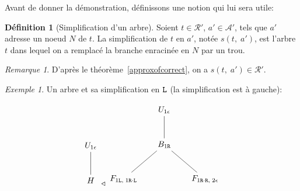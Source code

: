 \documentclass[11pt,a4paper]{article}
\theoremstyle{plain}
\theoremstyle{definition}
\newtheorem{definition}{Définition}
\theoremstyle{remark}
\newtheorem{remark}{Remarque}
\newtheorem{example}{Exemple}
\newcommand*{\Left}{\textnormal{\texttt{L}}}
\newcommand*{\Right}{\textnormal{\texttt{R}}}
\newcommand*{\treeaddresses}{\ensuremath{\mathcal{A'}}}
\newcommand*{\representationspartial}{\ensuremath{\mathcal{R'}}}
\newcommand*{\relapprox}{\ensuremath{\triangleleft}}
\newcommand*{\unknown}{H}
\newcommand*{\treesimplify}{\ensuremath{s}}
\begin{document}
Avant de donner la démonstration, définissons une notion qui lui sera utile:

\begin{definition}[Simplification d'un arbre]
    Soient $t \in \representationspartial$, $a' \in \treeaddresses$, tels que $a'$ adresse un noeud $N$ de $t$. La simplification de $t$ en $a'$, notée $\treesimplify(t, \; a')$, est l'arbre $t$ dans lequel on a remplacé la branche enracinée en $N$ par un trou. 
\end{definition}

\begin{remark}
    D'après le théorème~\ref{approxofcorrect}, on a $\treesimplify(t, \; a') \in \representationspartial$.
\end{remark}

\begin{example}
    Un arbre et sa simplification en $\Left$ (la simplification est à gauche):

        \begin{equation*}
        \begin{tikzpicture}%
            [level distance=1.5cm,
            level 2/.style={sibling distance=3.5cm}]
            \node {$U_{1 \epsilon}$}
            child {node {$\unknown$}
            };
        \end{tikzpicture}
        \relapprox
        \begin{tikzpicture}%
            [level distance=1.5cm,
            level 2/.style={sibling distance=3.5cm}]
            \node {$U_{1 \epsilon}$}
            child {node {$B_{1 \Right}$}
                child {node {$F_{1 \Left, \; 1 \Right \cdot \Left}$}}
                child {node {$F_{1 \Right \cdot \Right, \; 2 \epsilon}$}}
            };
        \end{tikzpicture}
    \end{equation*}
\end{example}
\end{document}
